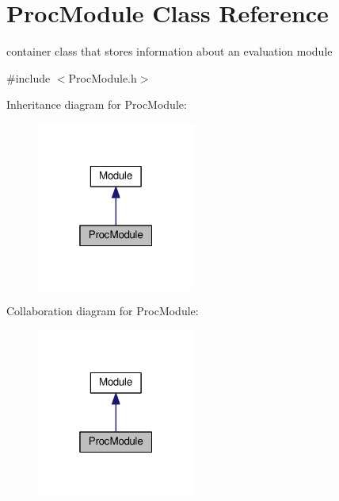 \hypertarget{classProcModule}{}\section{Proc\+Module Class Reference}
\label{classProcModule}


container class that stores information about an evaluation module  




{\ttfamily \#include $<$Proc\+Module.\+h$>$}



Inheritance diagram for Proc\+Module\+:
\nopagebreak
\begin{figure}[H]
\begin{center}
\leavevmode
\includegraphics[width=148pt]{classProcModule__inherit__graph}
\end{center}
\end{figure}


Collaboration diagram for Proc\+Module\+:
\nopagebreak
\begin{figure}[H]
\begin{center}
\leavevmode
\includegraphics[width=148pt]{classProcModule__coll__graph}
\end{center}
\end{figure}

